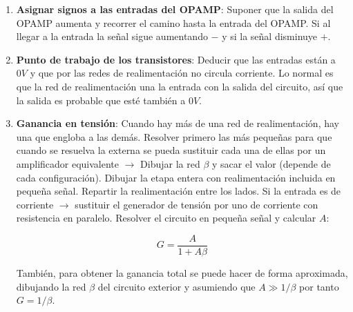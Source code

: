 \documentclass[10pt,landscape]{article}
\makeatletter
\renewcommand{\section}{\@startsection{section}{1}{0mm}%
                                {-1ex plus -.5ex minus -.2ex}%
                                {0.5ex plus .2ex}%
                                {\normalfont\large\bfseries}}
\makeatother
\begin{document}
\begin{multicols}{3}
\begin{enumerate}
	\item \textbf{Asignar signos a las entradas del OPAMP}: Suponer que la salida del OPAMP aumenta y recorrer el camino hasta la entrada del OPAMP. Si al llegar a la entrada la señal sigue aumentando $-$ y si la señal disminuye $+$.
	\item \textbf{Punto de trabajo de los transistores}: Deducir que las entradas están a $0V$ y que por las redes de realimentación no circula corriente. Lo normal es que la red de realimentación una la entrada con la salida del circuito,  así que la salida es probable que esté también a $0V$.
	\item \textbf{Ganancia en tensión}: Cuando hay más de una red de realimentación, hay una que engloba a las demás. Resolver primero las más pequeñas para que cuando se resuelva la externa se pueda sustituir cada una de ellas por un amplificador equivalente $\rightarrow$ Dibujar la red $\beta$ y sacar el valor (depende de cada configuración). Dibujar la etapa entera con realimentación incluida en pequeña señal. Repartir la realimentación entre los lados. Si la entrada es de corriente $\rightarrow$ sustituir el generador de tensión por uno de corriente con resistencia en paralelo. Resolver el circuito en pequeña señal y calcular $A$:
	
	\begin{equation*}
		G = \frac{A}{1 + A \beta}
	\end{equation*}
	
	También, para obtener la ganancia total se puede hacer de forma aproximada, dibujando la red $\beta$ del circuito exterior y asumiendo que $A \gg 1/\beta$ por tanto $G = 1 / \beta$.
	
\end{enumerate}

\newpage






\newpage


\end{multicols}
\end{document}
